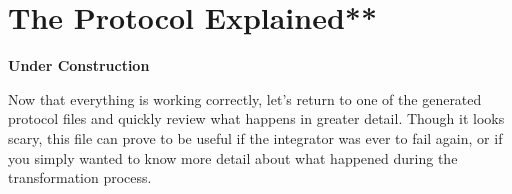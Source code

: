 \newpage
\section{The Protocol Explained**}
\genHeader


{\bf Under Construction}

Now that everything is working correctly, let's return to one of the generated protocol files and quickly review what happens in greater detail. Though it looks
scary, this file can prove to be useful if the integrator was ever to fail again, or if you simply wanted to know more detail about what happened during the
transformation process.

